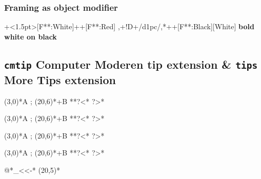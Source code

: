 \documentclass{article}
\begin{document}
\subsubsection{Framing as object modifier}
  \xy *+<1.5pt>[F**:White]++[F**:Red]
,+!D+/d1pc/,*++[F**:Black][White]
\txt\bf{bold white on black}\endxy

\subsection{\texttt{cmtip} Computer Moderen tip extension
 \& \texttt{tips} More Tips extension}
{
\xy (3,0)*{A} ; (20,6)*+{B}
**\dir{-}?<*\dir{<} ?>*\dir{>} \endxy

\xy (3,0)*{A} ; (20,6)*+{B}
**\dir{-}?<*\dir{<} ?>*\dir{>} \endxy

\xy (3,0)*{A} ; (20,6)*+{B}
**\dir{-}?<*{\UseTips\dir{<}} ?>*{\NoTips\dir{>}} \endxy

\xy (3,0)*{A} ; (20,6)*+{B}
**\dir{-}?<*{\UseTips\dir{<}} ?>*{\NoTips\dir{>}} \endxy
}

{
\xy*{} \ar
@{*{\UseTips\dir_{<<}}-*{\NoTips\dir{>}}}
(20,5)*{} \endxy
}
\begingroup%
 \def\Dx#1#2{\hbox{\def\1{#1{#2}}\enspace\tt\string\dir\codeof\1}}
 \def\DC#1#{\DCx{#1}}
 \def\DCx#1#2{ \Dx{#1}{#2} &
   $\vcenter{\xy
   0*\cir<5pt>{} ; (16,5)*=<10.1pt>{}*\frm{-} **[Red]\dir#1{.} **h\dir#1{#2}
  \endxy}$
}
 \def\DT#1#{\DTx{#1}}
 \def\DTx#1#2{\Dx{#1}{#2} & $\vcenter{\xy
   -(4,2.5)*{} ; (4,0)*{} **{} ?>*\dir#1{#2} **[Red]\dir#1{.}
  \endxy}$}

\def\doalltips#1#2{
\par\noindent
\paragraph{Tips using #1, size #2}\mbox{}\\
\SelectTips{#1}{#2}
\UseTips
\begin{tabular}{rlrlrlrlrl}
 \DT{>}	 &\DT^{>} &\DT_{>} &\DT2{>} &\DT3{>} \\
 \DT{<}	 &\DT^{<} &\DT_{<} &\DT2{<} &\DT3{<} \\
 \DT{>>} &\DT^{>>} &\DT_{>>} &\DT2{>>} &\DT3{>>} \\
 \DT{<<} &\DT^{<<} &\DT_{<<} &\DT2{<<} &\DT3{<<} \\
 \DT{>|} &\DT{>>|} &\DT{|<}  &\DT{|<<} &\DT{*}	 \\
\end{tabular}
}
\end{document}

